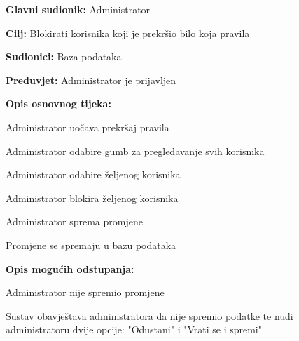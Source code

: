 				\noindent {}
					\begin{packed_item}
	
						\item \textbf{Glavni sudionik: }Administrator
						\item  \textbf{Cilj:} Blokirati korisnika koji je prekršio bilo koja pravila
						\item  \textbf{Sudionici:} Baza podataka
						\item  \textbf{Preduvjet:} Administrator je prijavljen
						\item  \textbf{Opis osnovnog tijeka:}
						
						\item[] \begin{packed_enum}
	
							\item Administrator uočava prekršaj pravila 
							\item Administrator odabire gumb za pregledavanje svih korisnika
							\item Administrator odabire željenog korisnika
							\item Administrator blokira željenog korisnika
							\item Administrator sprema promjene
							\item Promjene se spremaju u bazu podataka

						\end{packed_enum}
						
						\item  \textbf{Opis mogućih odstupanja:}
						
						\item[] \begin{packed_item}
	
							\item[5.a] Administrator nije spremio promjene
								\begin{packed_item}
									\item Sustav obavještava administratora da nije spremio podatke te nudi administratoru dvije opcije: "Odustani" i "Vrati se i spremi"
								\end{packed_item}
							
						\end{packed_item}						
					\end{packed_item}
					
